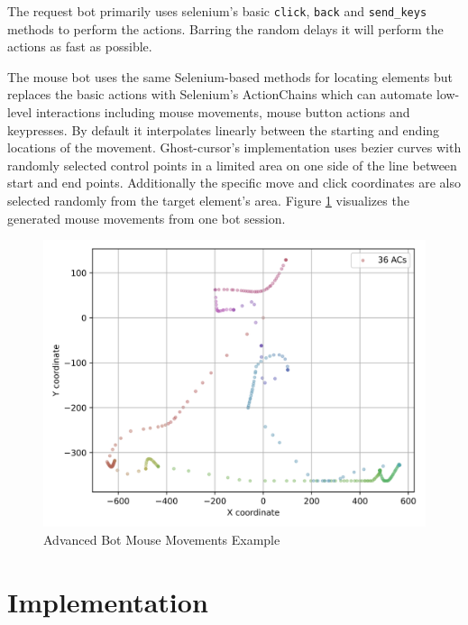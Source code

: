 \documentclass[
    fontsize=12pt,
    headings=small,
    parskip=half,           %
    bibliography=totoc,
    numbers=noenddot,       %
    open=any,               %
    final,                   %
    table
]{scrreprt}
\begin{document}
The request bot primarily uses selenium's basic \lstinline{click}, \lstinline{back} and \lstinline{send_keys} methods to perform the actions. Barring the random delays it will perform the actions as fast as possible.


The mouse bot uses the same Selenium-based methods for locating elements but replaces the basic actions with Selenium's ActionChains which can automate low-level interactions including mouse movements, mouse button actions and keypresses. By default it interpolates linearly between the starting and ending locations of the movement. Ghost-cursor's implementation uses bezier curves with randomly selected control points in a limited area on one side of the line between start and end points. Additionally the specific move and click coordinates are also selected randomly from the target element's area. Figure \ref{fig:bot_mouse_heatmap} visualizes the generated mouse movements from one bot session.


\begin{figure}[h]
    \includegraphics[width=\textwidth]{figures/bot_mouse_heatmap.png}
    \caption{Advanced Bot Mouse Movements Example}
    \label{fig:bot_mouse_heatmap}
\end{figure}



\section{Implementation}
\end{document}
